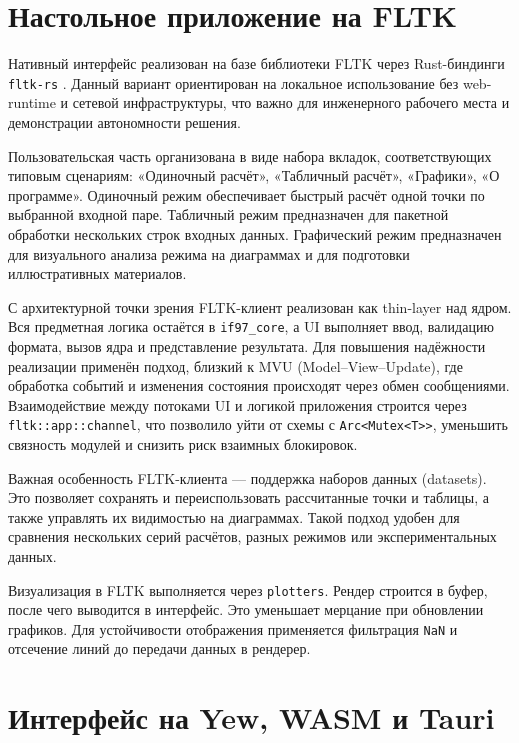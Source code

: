 \section{Настольное приложение на FLTK}

Нативный интерфейс реализован на базе библиотеки FLTK через Rust-биндинги \texttt{fltk-rs} \cite{fltk_rs_docs}.  
Данный вариант ориентирован на локальное использование без web-runtime и сетевой инфраструктуры,
что важно для инженерного рабочего места и демонстрации автономности решения.  

Пользовательская часть организована в виде набора вкладок,
соответствующих типовым сценариям:
«Одиночный расчёт», «Табличный расчёт», «Графики», «О программе».  
Одиночный режим обеспечивает быстрый расчёт одной точки по выбранной входной паре.  
Табличный режим предназначен для пакетной обработки нескольких строк входных данных.  
Графический режим предназначен для визуального анализа режима на диаграммах и для подготовки иллюстративных материалов.  

С архитектурной точки зрения FLTK-клиент реализован как thin-layer над ядром.  
Вся предметная логика остаётся в \texttt{if97\_core}, а UI выполняет ввод, валидацию формата, вызов ядра и представление результата.  
Для повышения надёжности реализации применён подход, близкий к MVU (Model--View--Update),
где обработка событий и изменения состояния происходят через обмен сообщениями.  
Взаимодействие между потоками UI и логикой приложения строится через \texttt{fltk::app::channel},
что позволило уйти от схемы с \texttt{Arc<Mutex<T>>},
уменьшить связность модулей и снизить риск взаимных блокировок.  

Важная особенность FLTK-клиента --- поддержка наборов данных (datasets).  
Это позволяет сохранять и переиспользовать рассчитанные точки и таблицы,
а также управлять их видимостью на диаграммах.  
Такой подход удобен для сравнения нескольких серий расчётов, разных режимов или экспериментальных данных.  

Визуализация в FLTK выполняется через \texttt{plotters}.
Рендер строится в буфер, после чего выводится в интерфейс.
Это уменьшает мерцание при обновлении графиков.
Для устойчивости отображения применяется фильтрация \texttt{NaN}
и отсечение линий до передачи данных в рендерер.

\section{Интерфейс на Yew, WASM и Tauri}

